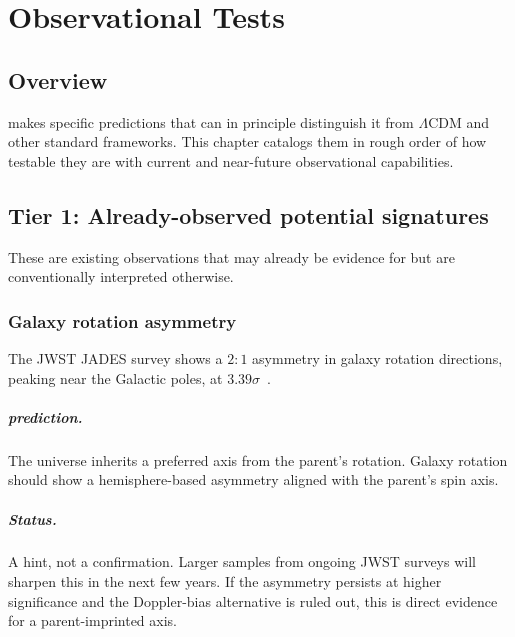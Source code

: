 \chapter{Observational Tests}
\label{chap:tests}

\section{Overview}

\SCT makes specific predictions that can in principle distinguish it from
$\Lambda$CDM and other standard frameworks. This chapter catalogs them in rough
order of how testable they are with current and near-future observational
capabilities.

\section{Tier 1: Already-observed potential signatures}

These are existing observations that may already be evidence for \SCT but are
conventionally interpreted otherwise.

\subsection{Galaxy rotation asymmetry}

The JWST JADES survey shows a $2\!:\!1$ asymmetry in galaxy rotation directions,
peaking near the Galactic poles, at $3.39\sigma$~\citep{shamir2025}.
\paragraph{\SCT prediction.} The universe inherits a preferred axis from the
parent's rotation. Galaxy rotation should show a hemisphere-based asymmetry
aligned with the parent's spin axis.
\paragraph{Status.} A hint, not a confirmation. Larger samples from ongoing JWST
surveys will sharpen this in the next few years. If the asymmetry persists at
higher significance and the Doppler-bias alternative is ruled out, this is direct
evidence for a parent-imprinted axis.


